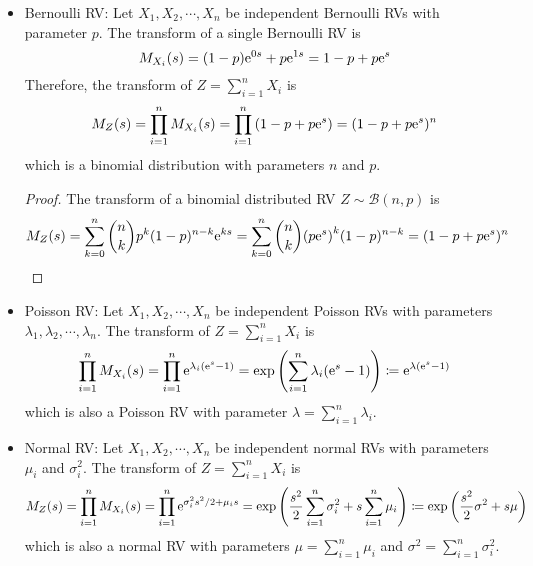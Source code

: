 \documentclass[device=normal, lang=en]{elegantbook}
\numberwithin{equation}{section}
\begin{document}
\begin{example}
    \begin{itemize}
        \item Bernoulli RV: Let $X_1, X_2, \cdots, X_n$ be independent Bernoulli RVs with parameter $p$. The transform of a single Bernoulli RV is
        \begin{equation}
            M_{X_i}(s) = (1 - p)\mathrm{e}^{0s} + p\mathrm{e}^{1s} = 1 - p + p \mathrm{e}^{s}
        \end{equation}
        Therefore, the transform of $Z = \sum_{i=1}^{n} X_i$ is
        \begin{equation}
            M_{Z}(s) = \prod_{i=1}^{n} M_{X_i}(s) = \prod_{i=1}^{n} \qty(1 - p + p \mathrm{e}^{s}) = (1 - p + p \mathrm{e}^{s})^n
        \end{equation}
        which is a binomial distribution with parameters $n$ and $p$.
        \begin{proof}
            The transform of a binomial distributed RV $Z \sim \mathcal{B}(n, p)$ is
            \begin{equation}
                M_{Z}(s) = \sum_{k=0}^{n} \binom{n}{k} p^k (1 - p)^{n - k} \mathrm{e}^{ks} = \sum_{k=0}^{n} \binom{n}{k} \qty(p\mathrm{e}^s)^k (1 - p)^{n - k} = (1 - p + p \mathrm{e}^{s})^n
            \end{equation}
        \end{proof}
        \item Poisson RV: Let $X_1, X_2, \cdots, X_n$ be independent Poisson RVs with parameters $\lambda_1, \lambda_2, \cdots, \lambda_n$. The transform of $Z = \sum_{i=1}^{n} X_i$ is
        \begin{equation}
            \prod_{i=1}^{n} M_{X_i}(s) = \prod_{i=1}^{n} \mathrm{e}^{\lambda_i(\mathrm{e}^{s} - 1)} = \exp\qty(\sum_{i=1}^{n} \lambda_i(\mathrm{e}^{s} - 1)) \coloneqq \mathrm{e}^{\lambda (\mathrm{e}^{s} - 1)}
        \end{equation}
        which is also a Poisson RV with parameter $\lambda = \sum_{i=1}^{n} \lambda_i$.
        \item Normal RV: Let $X_1, X_2, \cdots, X_n$ be independent normal RVs with parameters $\mu_i$ and $\sigma_i^2$. The transform of $Z = \sum_{i=1}^{n} X_i$ is
        \begin{equation}
            M_{Z}(s) = \prod_{i=1}^{n} M_{X_i}(s) = \prod_{i=1}^{n} \mathrm{e}^{\sigma_i^2 s^2/2 + \mu_i s} = \exp \qty(\frac{s^2}{2} \sum_{i=1}^{n} \sigma_i^2 + s \sum_{i=1}^{n} \mu_i) \coloneqq \exp\qty(\frac{s^2}{2} \sigma^2 + s \mu)
        \end{equation}
        which is also a normal RV with parameters $\mu = \sum_{i=1}^{n} \mu_i$ and $\sigma^2 = \sum_{i=1}^{n} \sigma_i^2$.
    \end{itemize}
\end{example}
\end{document}
